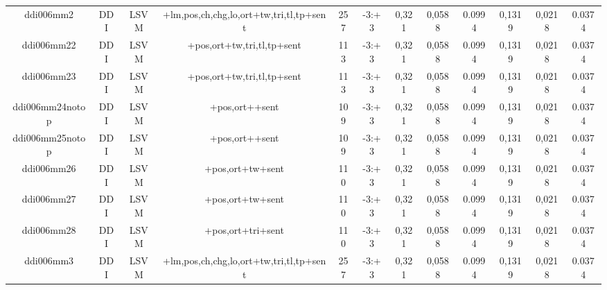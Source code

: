 \documentclass[a4paper]{article}
\begin{document}
\begin{landscape}
\begin{center}
\begin{tabular}{ |c|c|c|c|c|c|c|c|c|c|c|c|}
 	
 
 	
 		
 		\small{ ddi006mm2 } & DDI & LSVM & +lm,pos,ch,chg,lo,ort+tw,tri,tl,tp+sent  &  257 &  -3:+3  &  0,321 & 0,0588 & 0.0994  &  0,1319 & 0,0218 & 0.0374 \\
 		

 	
 
 	
 		
 		\small{ ddi006mm22 } & DDI & LSVM & +pos,ort+tw,tri,tl,tp+sent  &  113 &  -3:+3  &  0,321 & 0,0588 & 0.0994  &  0,1319 & 0,0218 & 0.0374 \\
 		

 	
 
 	
 		
 		\small{ ddi006mm23 } & DDI & LSVM & +pos,ort+tw,tri,tl,tp+sent  &  113 &  -3:+3  &  0,321 & 0,0588 & 0.0994  &  0,1319 & 0,0218 & 0.0374 \\
 		

 	
 
 	
 		
 		\small{ ddi006mm24notop } & DDI & LSVM & +pos,ort++sent  &  109 &  -3:+3  &  0,321 & 0,0588 & 0.0994  &  0,1319 & 0,0218 & 0.0374 \\
 		

 	
 
 	
 		
 		\small{ ddi006mm25notop } & DDI & LSVM & +pos,ort++sent  &  109 &  -3:+3  &  0,321 & 0,0588 & 0.0994  &  0,1319 & 0,0218 & 0.0374 \\
 		

 	
 
 	
 		
 		\small{ ddi006mm26 } & DDI & LSVM & +pos,ort+tw+sent  &  110 &  -3:+3  &  0,321 & 0,0588 & 0.0994  &  0,1319 & 0,0218 & 0.0374 \\
 		

 	
 
 	
 		
 		\small{ ddi006mm27 } & DDI & LSVM & +pos,ort+tw+sent  &  110 &  -3:+3  &  0,321 & 0,0588 & 0.0994  &  0,1319 & 0,0218 & 0.0374 \\
 		

 	
 
 	
 		
 		\small{ ddi006mm28 } & DDI & LSVM & +pos,ort+tri+sent  &  110 &  -3:+3  &  0,321 & 0,0588 & 0.0994  &  0,1319 & 0,0218 & 0.0374 \\
 		

 	
 
 	
 		
 		\small{ ddi006mm3 } & DDI & LSVM & +lm,pos,ch,chg,lo,ort+tw,tri,tl,tp+sent  &  257 &  -3:+3  &  0,321 & 0,0588 & 0.0994  &  0,1319 & 0,0218 & 0.0374 \\
 		


\end{tabular}
\end{center}
\end{landscape}
\end{document}
